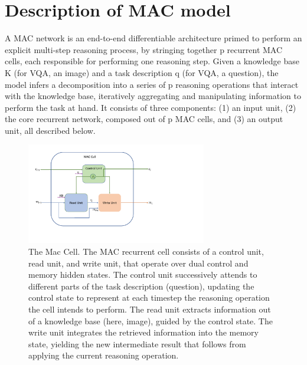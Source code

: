 \section{Description of MAC model}


A MAC network is an end-to-end differentiable architecture primed to perform an explicit multi-step reasoning process, by stringing together p recurrent MAC cells, each responsible for performing one reasoning step. Given a knowledge base K (for VQA, an image) and a task description q (for VQA, a question), the model infers a decomposition into a series of p reasoning operations that interact with the knowledge base, iteratively aggregating and manipulating information to perform the task at hand. It consists of three components: (1) an input unit, (2) the core recurrent network, composed out of p MAC cells, and (3) an output unit, all described below.

\begin{figure}[htbp]
	\centering
	\includegraphics[width=0.7\textwidth]{img/mac_cell.pdf}
	\caption{The Mac Cell. The MAC recurrent cell consists of a control unit, read unit, and write unit, that operate over dual control and memory hidden states. The control unit successively attends to different parts of the task description (question), updating the control state to represent at each timestep the reasoning operation the cell intends to perform. The read unit extracts information out of a knowledge base (here, image), guided by the control state. The write unit integrates the retrieved information into the memory state, yielding the new intermediate result that follows from applying the current reasoning operation.}
	\label{fig:core_concepts}
\end{figure}

